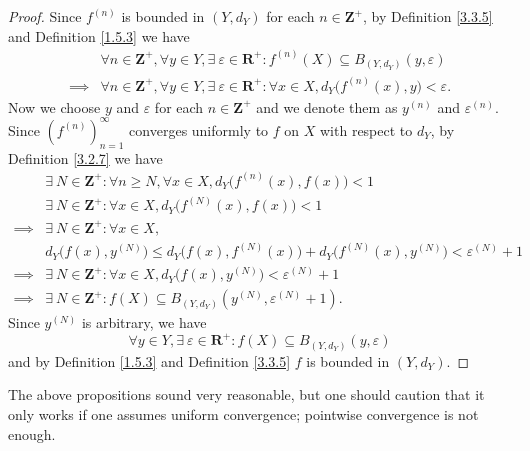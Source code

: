 \begin{proof}
    Since \(f^{(n)}\) is bounded in \((Y, d_Y)\) for each \(n \in \mathbf{Z}^+\), by Definition \ref{3.3.5} and Definition \ref{1.5.3} we have
    \begin{align*}
                 & \forall n \in \mathbf{Z}^+, \forall y \in Y, \exists\ \varepsilon \in \mathbf{R}^+ : f^{(n)}(X) \subseteq B_{(Y, d_Y)}(y, \varepsilon)          \\
        \implies & \forall n \in \mathbf{Z}^+, \forall y \in Y, \exists\ \varepsilon \in \mathbf{R}^+ : \forall x \in X, d_Y\big(f^{(n)}(x), y\big) < \varepsilon.
    \end{align*}
    Now we choose \(y\) and \(\varepsilon\) for each \(n \in \mathbf{Z}^+\) and we denote them as \(y^{(n)}\) and \(\varepsilon^{(n)}\).
    Since \((f^{(n)})_{n = 1}^\infty\) converges uniformly to \(f\) on \(X\) with respect to \(d_Y\), by Definition \ref{3.2.7} we have
    \begin{align*}
                 & \exists\ N \in \mathbf{Z}^+ : \forall n \geq N, \forall x \in X, d_Y\big(f^{(n)}(x), f(x)\big) < 1                       \\
                 & \exists\ N \in \mathbf{Z}^+ : \forall x \in X, d_Y\big(f^{(N)}(x), f(x)\big) < 1                                         \\
        \implies & \exists\ N \in \mathbf{Z}^+ : \forall x \in X,                                                                           \\
                 & d_Y\big(f(x), y^{(N)}\big) \leq d_Y\big(f(x), f^{(N)}(x)\big) + d_Y\big(f^{(N)}(x), y^{(N)}\big) < \varepsilon^{(N)} + 1 \\
        \implies & \exists\ N \in \mathbf{Z}^+ : \forall x \in X, d_Y\big(f(x), y^{(N)}\big) < \varepsilon^{(N)} + 1                        \\
        \implies & \exists\ N \in \mathbf{Z}^+ : f(X) \subseteq B_{(Y, d_Y)}(y^{(N)}, \varepsilon^{(N)} + 1).
    \end{align*}
    Since \(y^{(N)}\) is arbitrary, we have
    \[
        \forall y \in Y, \exists\ \varepsilon \in \mathbf{R}^+ : f(X) \subseteq B_{(Y, d_Y)}(y, \varepsilon)
    \]
    and by Definition \ref{1.5.3} and Definition \ref{3.3.5} \(f\) is bounded in \((Y, d_Y)\).
\end{proof}

\begin{remark}\label{3.3.7}
    The above propositions sound very reasonable, but one should caution that it only works if one assumes uniform convergence;
    pointwise convergence is not enough.
\end{remark}

